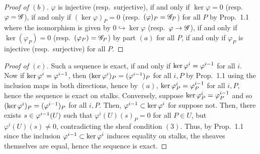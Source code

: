 \documentclass[10pt]{article}
\theoremstyle{definition}
\theoremstyle{remark}
\numberwithin{equation}{section}
\numberwithin{figure}{subsubsection}
\let\Im\relax
\DeclareMathOperator{\Im}{im}
\begin{document}
\begin{proof}[Proof of $(b)$]
  $\varphi$ is injective (resp.~surjective), if and only if $\ker\varphi = 0$
  (resp.~$\Im\varphi = \mathscr{G}$), if and only if $(\ker\varphi)_P = 0$
  (resp.~$(\Im\varphi)_P = \mathscr{G}_P$) for all $P$ by Prop.~1.1
  where the isomorphism is given by $0 \hookrightarrow \ker\varphi$ (resp.\
  $\Im\varphi \to \mathscr{G}$), if and only if $\ker(\varphi_P) = 0$ (resp.~$\Im(\varphi_P) = \mathscr{G}_P$) by part $(a)$ for all $P$, if and only if $\varphi_P$ is injective (resp.~surjective) for all $P$.
\end{proof}
\begin{proof}[Proof of $(c)$]
  Such a sequence is exact, if and only if $\ker\varphi^i = \Im\varphi^{i-1}$
  for all $i$. Now if $\ker\varphi^i = \Im\varphi^{i-1}$, then
  $(\ker\varphi^i)_P = (\Im\varphi^{i-1})_P$ for all $i,P$ by Prop.~1.1 using
  the inclusion maps in both directions, hence by $(a)$, $\ker \varphi^i_P =
  \Im\varphi^{i-1}_P$ for all $i,P$, hence the sequence is exact on stalks.
  Conversely, suppose $\ker \varphi^i_P = \Im\varphi^{i-1}_P$ and so
  $(\ker\varphi^i)_P = (\Im\varphi^{i-1})_P$ for all $i,P$. Then,
  $\Im\varphi^{i-1} \subset \ker \varphi^{i}$ for suppose not. Then, there
  exists $s \in \Im\varphi^{i-1}(U)$ such that $\varphi^i(U)(s)_P = 0$ for all
  $P \in U$, but $\varphi^i(U)(s) \ne 0$, contradicting the sheaf
  condition $(3)$. Thus, by Prop.~1.1 since the inclusion $\Im\varphi^{i-1}
  \subset \ker \varphi^{i}$ induces equality on stalks, the sheaves themselves
  are equal, hence the sequence is exact.
\end{proof}
\end{document}
